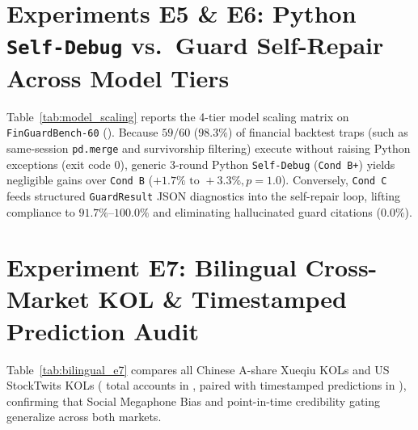 \section{Experiments E5 \& E6: Python \texttt{Self-Debug} vs.\ Guard Self-Repair Across Model Tiers}
\label{app:e5}
Table~\ref{tab:model_scaling} reports the 4-tier model scaling matrix on \texttt{FinGuardBench-60} (). Because $59/60$ ($98.3\%$) of financial backtest traps (such as same-session \texttt{pd.merge} and survivorship filtering) execute without raising Python exceptions (exit code $0$), generic 3-round Python \texttt{Self-Debug} (\texttt{Cond B+}) yields negligible gains over \texttt{Cond B} ($+1.7\%\text{ to }+3.3\%, p=1.0$). Conversely, \texttt{Cond C} feeds structured \texttt{GuardResult} JSON diagnostics into the self-repair loop, lifting compliance to $91.7\%\text{--}100.0\%$ and eliminating hallucinated guard citations ($0.0\%$).

\vspace{-0.12cm}
\begin{table}[!h]
\centering
{}
\vspace{-0.14cm}
\caption{Cross-model scaling of compliance and hallucinated guard citations across 4 capability tiers (Experiment~E6).}
\label{tab:model_scaling}
\vspace{-0.16cm}
\end{table}

\section{Experiment E7: Bilingual Cross-Market KOL \& Timestamped Prediction Audit}
\label{app:e7}
Table~\ref{tab:bilingual_e7} compares all \KOLCNCount{} Chinese A-share Xueqiu KOLs and \KOLUSCount{} US StockTwits KOLs (\KOLTotalAccounts{} total accounts in , paired with \KOLPredRows{} timestamped predictions in ), confirming that Social Megaphone Bias and point-in-time credibility gating generalize across both markets.

